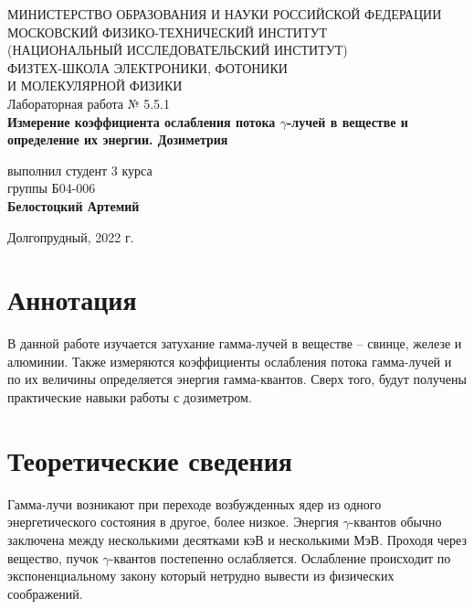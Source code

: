 \documentclass[a4paper,12pt]{article}
\begin{document}
 

\begin{titlepage}
	\begin{center}
		\large 	МИНИСТЕРСТВО ОБРАЗОВАНИЯ И НАУКИ РОССИЙСКОЙ ФЕДЕРАЦИИ\\
				МОСКОВСКИЙ ФИЗИКО-ТЕХНИЧЕСКИЙ ИНСТИТУТ \\
				(НАЦИОНАЛЬНЫЙ ИССЛЕДОВАТЕЛЬСКИЙ ИНСТИТУТ)\\ 
				ФИЗТЕХ-ШКОЛА ЭЛЕКТРОНИКИ, ФОТОНИКИ \\
				И МОЛЕКУЛЯРНОЙ ФИЗИКИ \\
		
		
		\vspace{4.0 cm}
		Лабораторная работа № 5.5.1 \\ 
		\LARGE \textbf{Измерение коэффициента ослабления потока $\gamma$-лучей в веществе и определение их энергии. Дозиметрия}
	\end{center}
	\vspace{3 cm} \large
	
	\begin{flushright}
		выполнил студент 3 курса \\
		{группы Б04-006}\\
		\textbf{Белостоцкий Артемий}\\
	\end{flushright}
	
	\vfill

	\begin{center}
	Долгопрудный, 2022 г.
	\end{center}
\end{titlepage}                                                                      

\section*{Аннотация}

В данной работе изучается затухание гамма-лучей в веществе -- свинце, железе и алюминии. Также измеряются коэффициенты ослабления потока гамма-лучей и по их величины определяется энергия гамма-квантов. Сверх того, будут получены практические навыки работы с дозиметром. 

\section*{Теоретические сведения}

Гамма-лучи возникают при переходе возбужденных ядер из одного энергетического состояния в другое, более низкое. Энергия $\gamma$-квантов обычно заключена между несколькими десятками кэВ и несколькими МэВ. Проходя через вещество, пучок $\gamma$-квантов постепенно ослабляется. Ослабление происходит по экспоненциальному закону который нетрудно вывести из физических соображений.
\end{document}
